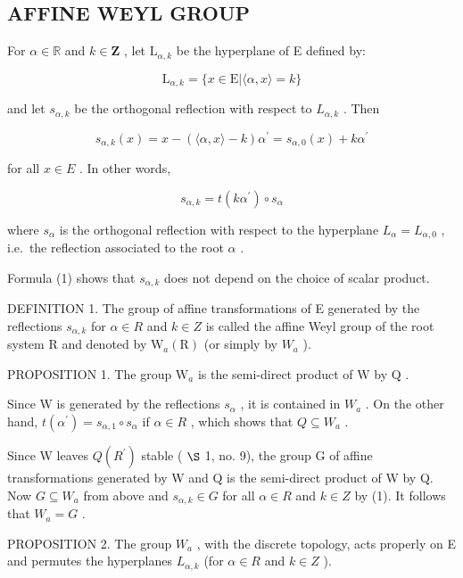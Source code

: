 \subsection{AFFINE WEYL GROUP}

For \(\alpha \in \mathbb{R}\) and \(k\in \mathbf{Z}\) , let \(\mathrm{L}_{\alpha ,k}\) be the hyperplane of E defined by:

\[
\mathrm{L} _ {\alpha , k} = \{x \in \mathrm{E} | \langle \alpha , x \rangle = k \}
\]

and let \(s_{\alpha, k}\) be the orthogonal reflection with respect to \(L_{\alpha, k}\) . Then

\[
s _ {\alpha , k} (x) = x - (\langle \alpha , x \rangle - k) \alpha^ {\prime} = s _ {\alpha , 0} (x) + k \alpha^ {\prime}
\]

for all \(x \in E\) . In other words,

\[
s _ {\alpha , k} = t (k \alpha^ {\prime}) \circ s _ {\alpha}\tag{1}
\]

where \(s_{\alpha}\) is the orthogonal reflection with respect to the hyperplane \(L_{\alpha} = L_{\alpha,0}\) , i.e.~the reflection associated to the root \(\alpha\) .

Formula (1) shows that \(s_{\alpha, k}\) does not depend on the choice of scalar product.

DEFINITION 1. The group of affine transformations of E generated by the reflections \(s_{\alpha,k}\) for \(\alpha \in R\) and \(k \in Z\) is called the affine Weyl group of the root system R and denoted by \(\mathrm{W}_{a}(\mathrm{R})\) (or simply by \(W_{a}\) ).

PROPOSITION 1. The group \(\mathrm{W}_a\) is the semi-direct product of \(\mathrm{W}\) by \(\mathrm{Q}\) .

Since W is generated by the reflections \(s_{\alpha}\) , it is contained in \(W_{a}\) . On the other hand, \(t(\alpha^{\prime}) = s_{\alpha,1} \circ s_{\alpha}\) if \(\alpha \in R\) , which shows that \(Q \subseteq W_{a}\) .

Since W leaves \(Q(R^{\prime})\) stable ( \(\S\) 1, no. 9), the group G of affine transformations generated by W and Q is the semi-direct product of W by Q. Now \(G \subseteq W_{a}\) from above and \(s_{\alpha,k} \in G\) for all \(\alpha \in R\) and \(k \in Z\) by (1). It follows that \(W_{a} = G\) .

PROPOSITION 2. The group \(W_{a}\) , with the discrete topology, acts properly on E and permutes the hyperplanes \(L_{\alpha,k}\) (for \(\alpha \in R\) and \(k \in Z\) ).

